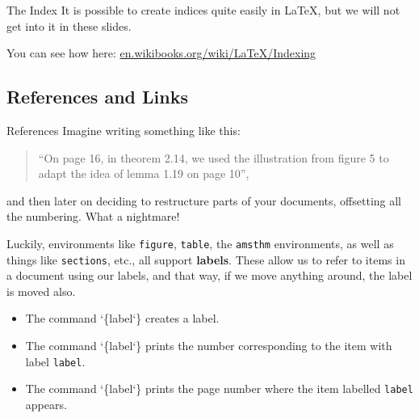\documentclass{beamer}
\begin{document}
    \begin{frame}{The Index}
        It is possible to create indices quite easily in \LaTeX, but we will not get into it in these slides. 
        
        \begin{center}
            \setlength{\fboxsep}{0pt}
        \end{center}
        
        You can see how here: \href{https://en.wikibooks.org/wiki/LaTeX/Indexing}{\ttfamily{}en.wikibooks.org/wiki/LaTeX/Indexing}
    \end{frame}

    \subsection{References and Links}
    \begin{frame}{References}
        Imagine writing something like this:
        \begin{quote}
            ``On page 16, in theorem 2.14, we used the illustration from figure 5 to adapt the idea of lemma 1.19 on page 10'',
        \end{quote}
        and then later on deciding to restructure parts of your documents, offsetting all the numbering.  What a nightmare!
        
        \medskip
        
        Luckily, environments like \texttt{figure}, \texttt{table}, the \texttt{amsthm} environments, as well as things like \texttt{sections}, etc., all support \textbf{labels}. These allow us to refer to items in a document using our labels, and that way, if we move anything around, the label is moved also.
        
        \begin{itemize}
            \item The command {\char`\{label\char`\}} creates a label.
            \item The command {\char`\{label\char`\}} prints the number corresponding to the item with label \texttt{label}. 
            \item The command {\char`\{label\char`\}} prints the page number where the item labelled \texttt{label} appears. 
        \end{itemize}
    \end{frame}
\end{document}
